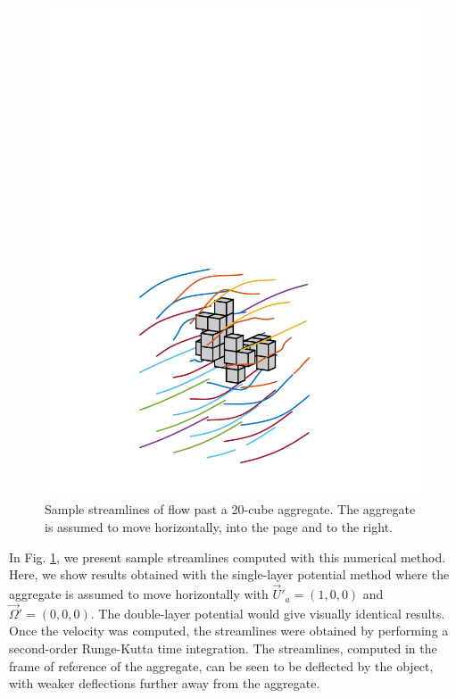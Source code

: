 \begin{figure}[ht]
	\begin{center}
	  \includegraphics[scale = 0.4]{./figures/fig_streamlines25_fig120.pdf}
	 \end{center}
	\caption{Sample streamlines of flow past a 20-cube aggregate. The aggregate is assumed to move horizontally, into the page and to the right.
	}
	\label{fig_stream}
	\end{figure}
	
	In Fig. \ref{fig_stream}, we present sample streamlines computed with this numerical method. Here, we show results obtained with the single-layer potential method where the aggregate is assumed to move horizontally with $\vec{U}'_a = (1,0,0)$ and $\vec{\Omega}' = (0,0,0)$. The double-layer potential would give visually identical results. Once the velocity was computed, the streamlines were obtained by performing a second-order Runge-Kutta time integration.  The streamlines, computed in the frame of reference of the aggregate, can be seen to be deflected by the object, with weaker deflections further away from the aggregate.

